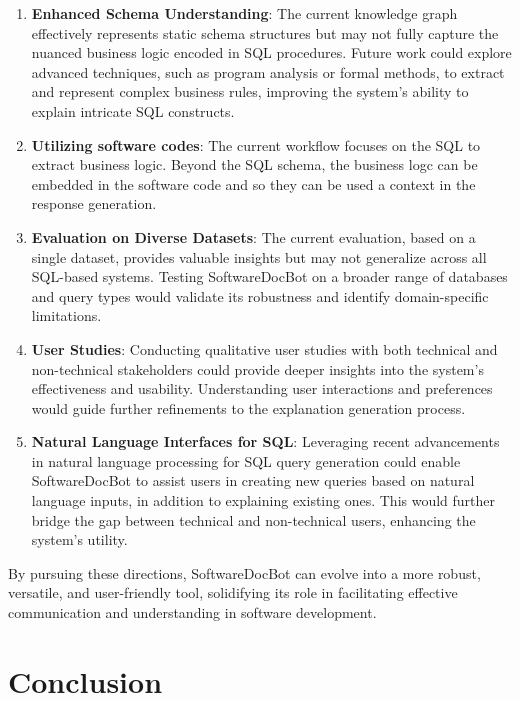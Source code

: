 \documentclass[11pt]{article}
\begin{document}
\begin{enumerate}
    \item \textbf{Enhanced Schema Understanding}: The current knowledge graph effectively represents static schema structures but may not fully capture the nuanced business logic encoded in SQL procedures. Future work could explore advanced techniques, such as program analysis or formal methods, to extract and represent complex business rules, improving the system’s ability to explain intricate SQL constructs.

     \item \textbf{Utilizing software codes}: The current workflow focuses on the SQL to extract business logic. Beyond the SQL schema, the business logc can be embedded in the software code and so they can be used a context in the response generation.

    \item \textbf{Evaluation on Diverse Datasets}: The current evaluation, based on a single dataset, provides valuable insights but may not generalize across all SQL-based systems. Testing SoftwareDocBot on a broader range of databases and query types would validate its robustness and identify domain-specific limitations.

    \item \textbf{User Studies}: Conducting qualitative user studies with both technical and non-technical stakeholders could provide deeper insights into the system’s effectiveness and usability. Understanding user interactions and preferences would guide further refinements to the explanation generation process.

    \item \textbf{Natural Language Interfaces for SQL}: Leveraging recent advancements in natural language processing for SQL query generation could enable SoftwareDocBot to assist users in creating new queries based on natural language inputs, in addition to explaining existing ones. This would further bridge the gap between technical and non-technical users, enhancing the system’s utility.

\end{enumerate}

By pursuing these directions, SoftwareDocBot can evolve into a more robust, versatile, and user-friendly tool, solidifying its role in facilitating effective communication and understanding in software development.

\section{Conclusion}
\end{document}
